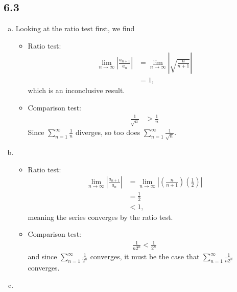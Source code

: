 \documentclass[10pt]{mypackage}
\begin{document}
\subsection{6.3}%
\begin{enumerate}[(a)]
  \item Looking at the ratio test first, we find
    \begin{itemize}
      \item Ratio test:
    \begin{align*}
      \lim_{n\rightarrow\infty}\left\vert \frac{a_{n+1}}{a_n} \right\vert &= \lim_{n\rightarrow\infty}\left\vert \sqrt{\frac{n}{n+1}} \right\vert\\
                                                                          &= 1,
    \end{align*}
    which is an inconclusive result.
      \item Comparison test:
        \begin{align*}
          \frac{1}{\sqrt{n}} &> \frac{1}{n} \tag*{$\forall n\geq 1$.}
        \end{align*}
        Since $\sum_{n=1}^{\infty}\frac{1}{n}$ diverges, so too does $\sum_{n=1}^{\infty}\frac{1}{\sqrt{n}}$.
    \end{itemize}
  \item 
    \begin{itemize}
      \item Ratio test:
        \begin{align*}
          \lim_{n\rightarrow\infty}\left\vert \frac{a_{n+1}}{a_n} \right\vert &= \lim_{n\rightarrow\infty}\left\vert \left(\frac{n}{n+1}\right)\left(\frac{1}{2}\right) \right\vert\\
                                                                              &= \frac{1}{2}\\
                                                                              &< 1,
        \end{align*}
        meaning the series converges by the ratio test.
      \item Comparison test:
        \begin{align*}
          \frac{1}{n2^n} < \frac{1}{2^n} \tag*{for all $n\geq 1$,}
        \end{align*}
        and since $\sum_{n=1}^{\infty}\frac{1}{2^n}$ converges, it must be the case that $\sum_{n=1}^{\infty}\frac{1}{n2^n}$ converges.
    \end{itemize}
  \item 

\end{enumerate}
\end{document}

